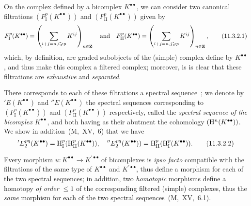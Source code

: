 \begin{env}[11.3.2]
\label{0.11.3.2}
On the complex defined by a bicomplex $K^{\bullet\bullet}$, we can consider two canonical filtrations $(F_\text{I}^p(K^{\bullet\bullet}))$ and $(F_\text{II}^p(K^{\bullet\bullet}))$ given by
\[
\label{0.11.3.2.1}
  F_\text{I}^p(K^{\bullet\bullet})=\left(\sum_{i+j=n,i\geqslant p}K^{ij}\right)_{n\in\mathbf{Z}}\quad\text{and}\quad F_\text{II}^p(K^{\bullet\bullet})=\left(\sum_{i+j=n,j\geqslant p}K^{ij}\right)_{n\in\mathbf{Z}},
  \tag{11.3.2.1}
\]
which, by definition, are graded subobjects of the (simple) complex define by $K^{\bullet\bullet}$, and thus make this complex a filtered complex; moreover, is is clear that these filtrations are \emph{exhaustive} and \emph{separated}.

There corresponds to each of these filtrations a spectral sequence~; we denote by $'E(K^{\bullet\bullet})$ and $''E(K^{\bullet\bullet})$ the spectral sequences corresponding to $(F_\text{I}^p(K^{\bullet\bullet}))$ and $(F_\text{II}^p(K^{\bullet\bullet}))$ respectively, called the \emph{spectral sequence of the bicomplex $K^{\bullet\bullet}$}, and both having as their abutment the cohomology $(\mathrm{H}^n(K^{\bullet\bullet}))$.
We show in addition~(M,~XV,~6) that we have
\[
\label{0.11.3.2.2}
  'E_2^{pq}(K^{\bullet\bullet})=\mathrm{H}_\text{I}^p(\mathrm{H}_\text{II}^p(K^{\bullet\bullet})),\quad ''E_2^{pq}(K^{\bullet\bullet}))=\mathrm{H}_\text{II}^p(\mathrm{H}_\text{I}^p(K^{\bullet\bullet})).
  \tag{11.3.2.2}
\]

Every morphism $u:K^{\bullet\bullet}\to K^{\prime\bullet\bullet}$ of bicomplexes is \emph{ipso facto} compatible with the filtrations of the same type of $K^{\bullet\bullet}$ and $K^{\prime\bullet\bullet}$, thus define a morphism for each of the two spectral sequences; in addition, two \emph{homotopic} morphisms define a homotopy \emph{of order $\leq 1$} of the corresponding filtered (simple) complexes, thus the \emph{same} morphism for each of the two spectral sequences~(M,~XV,~6.1).
\end{env}

